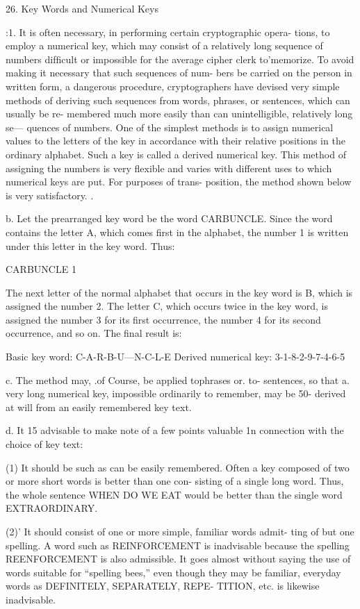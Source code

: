 26. Key Words and Numerical Keys

:1. It is often necessary, in performing certain cryptographic opera-
tions, to employ a numerical key, which may consist of a relatively long
sequence of numbers difﬁcult or impossible for the average cipher clerk
to'memorize. To avoid making it necessary that such sequences of num-
bers be carried on the person in written form, a dangerous procedure,
cryptographers have devised very simple methods of deriving such
sequences from words, phrases, or sentences, which can usually be re-
membered much more easily than can unintelligible, relatively long se—
quences of numbers. One of the simplest methods is to assign numerical
values to the letters of the key in accordance with their relative positions
in the ordinary alphabet. Such a key is called a derived numerical key.
This method of assigning the numbers is very ﬂexible and varies with
different uses to which numerical keys are put. For purposes of trans-
position, the method shown below is very satisfactory. .

b. Let the prearranged key word be the word CARBUNCLE. Since
the word contains the letter A, which comes ﬁrst in the alphabet, the
number 1 is written under this letter in the key word. Thus:

CARBUNCLE
1


The next letter of the normal alphabet that occurs in the key word is B,
which is assigned the number 2. The letter C, which occurs twice in the
key word, is assigned the number 3 for its ﬁrst occurrence, the number 4
for its second occurrence, and so on. The ﬁnal result is:

Basic key word: C-A-R-B-U—N-C-L-E
Derived numerical key: 3-1-8-2-9-7-4-6-5

c. The method may, .of Course, be applied tophrases or. to- sentences,
so that a. very long numerical key, impossible ordinarily to remember,
may be 50- derived at will from an easily remembered key text.

d. It 15 advisable to make note of a few points valuable 1n connection
with the choice of key text:

(1) It should be such as can be easily remembered. Often a key
composed of two or more short words is better than one con-
sisting of a single long word. Thus, the whole sentence WHEN
DO WE EAT would be better than the single word
EXTRAORDINARY.

(2)' It should consist of one or more simple, familiar words admit-
ting of but one spelling. A word such as REINFORCEMENT
is inadvisable because the spelling REENFORCEMENT is
also admissible. It goes almost without saying the use of words
suitable for “spelling bees,” even though they may be familiar,
everyday words as DEFINITELY, SEPARATELY, REPE-
TITION, etc. is likewise inadvisable.

